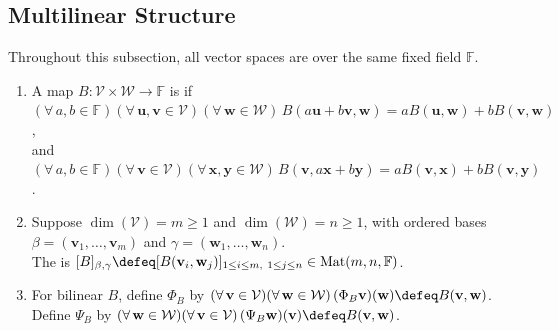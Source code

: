 \subsection{Multilinear Structure}
Throughout this subsection, all vector spaces are over the same fixed field $\mathbb{F}$.

\begin{definition} \label{def:bilinear-form-and-matrix} 
\begin{enumerate}[label=(\roman*)]
\setlength{\itemsep}{0pt}
\item A map $B:\mathcal{V}\times\mathcal{W}\to\mathbb{F}$ is  if $(\forall\,a,b\in\mathbb{F})(\forall\,\mathbf{u},\mathbf{v}\in\mathcal{V})(\forall\,\mathbf{w}\in\mathcal{W})\,B(a\mathbf{u}+b\mathbf{v},\mathbf{w})=aB(\mathbf{u},\mathbf{w})+bB(\mathbf{v},\mathbf{w})$,\\
and $(\forall\,a,b\in\mathbb{F})(\forall\,\mathbf{v}\in\mathcal{V})(\forall\,\mathbf{x},\mathbf{y}\in\mathcal{W})\,B(\mathbf{v},a\mathbf{x}+b\mathbf{y})=aB(\mathbf{v},\mathbf{x})+bB(\mathbf{v},\mathbf{y})$.
\item Suppose $\dim(\mathcal{V})=m\geq1$ and $\dim(\mathcal{W})=n\geq1$, with ordered bases $\beta=(\mathbf{v}_1,\ldots,\mathbf{v}_m)$ and $\gamma=(\mathbf{w}_1,\ldots,\mathbf{w}_n)$.\\
The  is $[B]_{\beta,\gamma}\defeq[B(\mathbf{v}_i,\mathbf{w}_j)]_{1\leq i\leq m,\ 1\leq j\leq n}\in\operatorname{Mat}(m,n,\mathbb{F})$.
\item For bilinear $B$, define $\Phi_B$ by $(\forall\,\mathbf{v}\in\mathcal{V})(\forall\,\mathbf{w}\in\mathcal{W})\,(\Phi_B\mathbf{v})(\mathbf{w})\defeq B(\mathbf{v},\mathbf{w})$.\\
Define $\Psi_B$ by $(\forall\,\mathbf{w}\in\mathcal{W})(\forall\,\mathbf{v}\in\mathcal{V})\,(\Psi_B\mathbf{w})(\mathbf{v})\defeq B(\mathbf{v},\mathbf{w})$.
\end{enumerate}
\end{definition}

